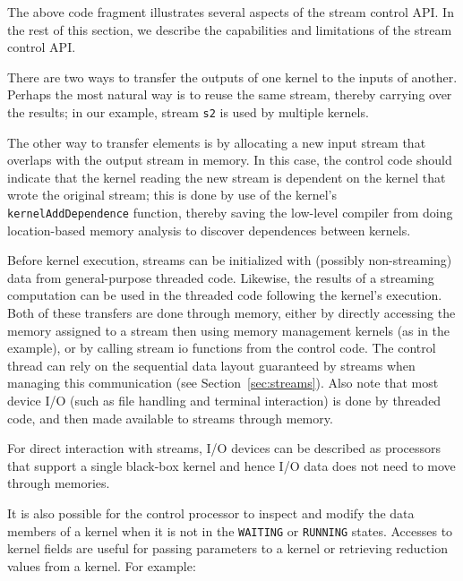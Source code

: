 The above code fragment illustrates several aspects of the stream
control API.  In the rest of this section, we describe the
capabilities and limitations of the stream control API.


There are two ways to transfer the outputs of one kernel to the inputs
of another.  Perhaps the most natural way is to reuse the same stream,
thereby carrying over the results; in our example, stream {\tt s2} is
used by multiple kernels.

The other way to transfer elements is by allocating a new input stream
that overlaps with the output stream in memory.  In this case, the
control code should indicate that the kernel reading the new stream is
dependent on the kernel that wrote the original stream; this is done
by use of the kernel's {\tt kernelAddDependence} function, thereby
saving the low-level compiler from doing location-based memory
analysis to discover dependences between kernels.


Before kernel execution, streams can be initialized with (possibly
non-streaming) data from general-purpose threaded code.  Likewise, the
results of a streaming computation can be used in the threaded code
following the kernel's execution.  Both of these transfers are done
through memory, either by directly accessing the memory assigned to a
stream then using memory management kernels (as in the example), or by
calling stream io functions from the control code.  The control thread
can rely on the sequential data layout guaranteed by streams when
managing this communication (see Section~\ref{sec:streams}).  Also
note that most device I/O (such as file handling and terminal
interaction) is done by threaded code, and then made available to
streams through memory.

For direct interaction with streams, I/O devices can be described as
processors that support a single black-box kernel and hence I/O data
does not need to move through memories.

It is also possible for the control processor to inspect and modify
the data members of a kernel when it is not in the {\tt WAITING} or
{\tt RUNNING} states. Accesses to kernel fields are useful for passing
parameters to a kernel or retrieving reduction values from a kernel.
For example:

